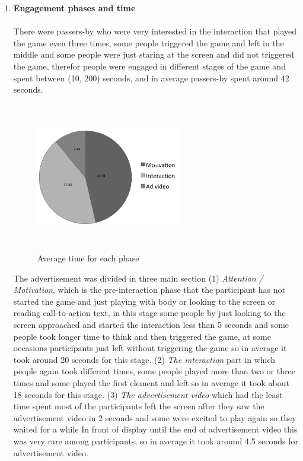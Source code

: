 \begin{enumerate}
\item \textbf{Engagement phases and time} \\
\\
There were passers-by who were very interested in the interaction that played the game even three times, some people triggered the game and left in the middle and some people were just staring at the screen and did not triggered the game, therefor people were engaged in different stages of the game and spent between (10, 200) seconds, and in average passers-by spent around 42 seconds.

\begin{figure}[H]
    \centering
    \includegraphics[width=0.6\textwidth,height=6.5cm]{Figures/8/body_inter_findings/body_avg_phases}
    \caption{Average time for each phase}%
    \label{fig:bodyaveragephases}%
\end{figure}

The advertisement was divided in three main section (1) \emph{Attention / Motivation}, which is the pre-interaction phase that the participant has not started the game and just playing with body or looking to the screen or reading call-to-action text, in this stage some people by just looking to the screen approached and started the interaction less than 5 seconds and some people took longer time to think and then triggered the game, at some occasions participants just left without triggering the game so in average it took around 20 seconds for this stage. (2) \emph{The interaction} part in which people again took different times, some people played more than two or three times and some played the first element and left so in average it took about 18 seconds for this stage. (3) \emph{The advertisement video} which had the least time spent most of the participants left the screen after they saw the advertisement video in 2 seconds and some were excited to play again so they waited for a while In front of display until the end of advertisement video this was very rare among participants, so in average it took around 4.5 seconds for advertisement video.



\end{enumerate}
